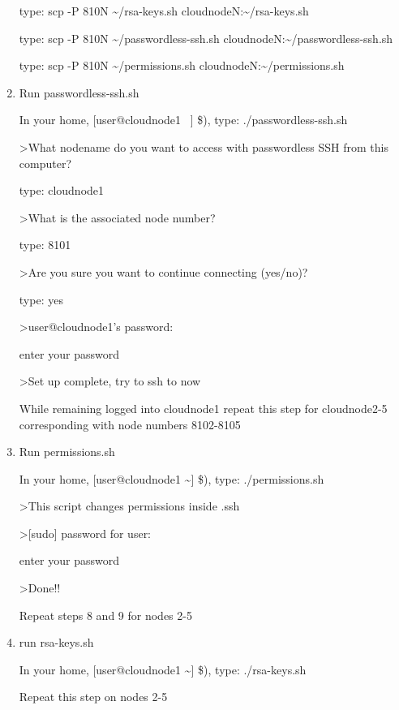 \begin{enumerate}
type:  scp -P 810N \textasciitilde{}/rsa-keys.sh cloudnodeN:\textasciitilde{}/rsa-keys.sh

type:  scp -P 810N \textasciitilde{}/passwordless-ssh.sh cloudnodeN:\textasciitilde{}/passwordless-ssh.sh

type:  scp -P 810N \textasciitilde{}/permissions.sh cloudnodeN:\textasciitilde{}/permissions.sh\\


\item Run passwordless-ssh.sh

In your home, [user@cloudnode1 ~] \$), type:
./passwordless-ssh.sh

\textgreater What nodename do you want to access with passwordless SSH from this computer?

type: cloudnode1

\textgreater What is the associated node number?

type: 8101

\textgreater Are you sure you want to continue connecting (yes/no)?

type: yes

\textgreater user@cloudnode1's password:

enter your password

\textgreater Set up complete, try to ssh to now

While remaining logged into cloudnode1 repeat this step for cloudnode2-5 corresponding with node numbers 8102-8105\\


\item Run permissions.sh

In your home, [user@cloudnode1 \textasciitilde{}] \$), type:
./permissions.sh

\textgreater This script changes permissions inside .ssh

\textgreater [sudo] password for user:

enter your password

\textgreater Done!!

Repeat steps 8 and 9 for nodes 2-5\\


\item run rsa-keys.sh

In your home, [user@cloudnode1 \textasciitilde{}] \$), type:
./rsa-keys.sh

Repeat this step on nodes 2-5


\end{enumerate}
